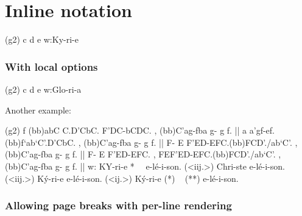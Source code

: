 \documentclass{article}
\begin{document}
\section*{Inline notation}

\begin{aretino}
(g2) c d e
w:Ky-ri-e
\end{aretino}

\subsubsection*{With local options}

\begin{aretino}[width-mm=80, zoom=1.2]
(g2) c d e
w:Glo-ri-a
\end{aretino}

Another example:

\noindent
\begin{aretino}
(g2) f (bb)abC C.D'CbC. F'DC-bCDC. , (bb)C'ag-fba g- g f. || a a'gf-ef.(bb)f`ab`C'.D'CbC. , (bb)C'ag-fba g- g f. || F- E F'ED-EFC.(bb)FCD'./ab`C'. , (bb)C'ag-fba g- g f. || F- E F'ED-EFC. , FEF'ED-EFC.(bb)FCD'./ab`C'. , (bb)C'ag-fba g- g f. ||
w: KY-ri-e *~~ e-lé-i-son. (<iij.>) Chri-ste e-lé-i-son. (<iij.>) Ký-ri-e e-lé-i-son. (<ij.>) Ký-ri-e (*) ~ (**) e-lé-i-son.
\end{aretino}

\noindent

\subsubsection*{Allowing page breaks with per-line rendering}

\end{document}
